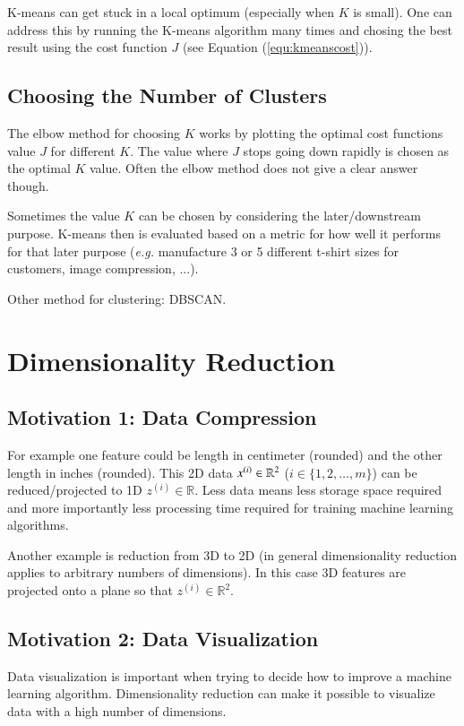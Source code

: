 \documentclass[a4paper,twoside,10pt]{article}
\begin{document}
K-means can get stuck in a local optimum (especially when $K$ is small). One can address this by running the K-means algorithm many times and chosing the best result using the cost function $J$ (see Equation (\ref{equ:kmeanscost})).

\subsection{Choosing the Number of Clusters}
The elbow method for choosing $K$ works by plotting the optimal cost functions value $J$ for different $K$.
The value where $J$ stops going down rapidly is chosen as the optimal $K$ value.
Often the elbow method does not give a clear answer though.

Sometimes the value $K$ can be chosen by considering the later/downstream purpose.
K-means then is evaluated based on a metric for how well it performs for that later purpose
(\emph{e.g.} manufacture 3 or 5 different t-shirt sizes for customers, image compression, ...).

Other method for clustering: DBSCAN.

\section{Dimensionality Reduction}
\subsection{Motivation 1: Data Compression}
For example one feature could be length in centimeter (rounded) and the other length in inches (rounded).
This 2D data $x^{(i)}\in\mathbb{R}^2$ ($i\in\{1,2,\ldots,m\}$) can be reduced/projected to 1D $z^{(i)}\in\mathbb{R}$.
Less data means less storage space required and more importantly less processing time required for training machine learning algorithms.

Another example is reduction from 3D to 2D (in general dimensionality reduction applies to arbitrary numbers of dimensions).
In this case 3D features are projected onto a plane so that $z^{(i)}\in\mathbb{R}^2$.

\subsection{Motivation 2: Data Visualization}
Data visualization is important when trying to decide how to improve a machine learning algorithm.
Dimensionality reduction can make it possible to visualize data with a high number of dimensions.
\end{document}
